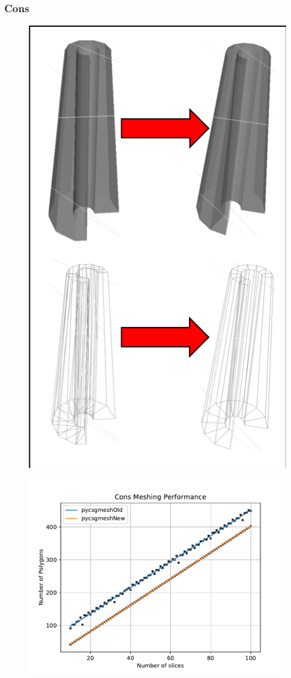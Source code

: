 \documentclass[12pt,a4paper]{article}
\begin{document}
\subsubsection{Cons}
\begin{figure}[h!]
\centering
\begin{minipage}{.2\textwidth}
  \centering
  \includegraphics[height=1\linewidth]{Images//Meshes//cons.png}
  \label{cons}
\end{minipage}%
\begin{minipage}{.3\textwidth}
  \centering
  \includegraphics[scale=0.35]{Images//Quad_fits//Cons_quad.pdf}
  \label{fig:test2}
\end{minipage}%
\end{figure}
\end{document}
